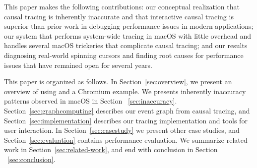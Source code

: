 This paper makes the following contributions: our conceptual realization that
causal tracing is inherently inaccurate and that interactive causal tracing is
superior than prior work in debugging performance issues in modern applications;
our system \xxx that performs system-wide tracing in macOS with little overhead
and handles several macOS trickeries that complicate causal tracing; and our
results diagnosing real-world spinning cursors and finding root causes for
performance issues that have remained open for several years.

This paper is organized as follows. In Section~\ref{sec:overview}, we present
an overview of using \xxx and a Chromium example.
We presents inherently inaccuracy patterns observed in macOS in Section
~\ref{sec:inaccuracy}.
Section~\ref{sec:graphcomputing} describes our event graph from causal tracing,
and Section~\ref{sec:implementation} describes our
tracing implementation and tools for user interaction.
In Section~\ref{sec:casestudy} we present other case
studies, and Section~\ref{sec:evaluation} contains performance evaluation.
We summarize related work in Section~\ref{sec:related-work}, and end with
conclusion in Section ~\ref{sec:conclusion}.
